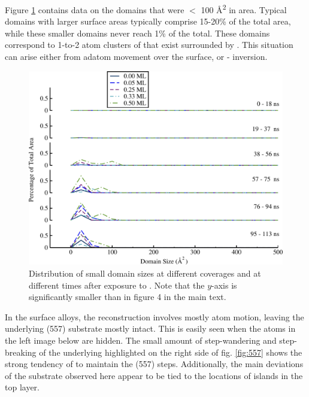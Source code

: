 \newpage

Figure \ref{fig:Pt_SI_small} contains data on the  domains that
were $<$ 100 \AA\textsuperscript{2} in area.  Typical domains with
larger surface areas typically comprise 15-20\% of the total area,
while these smaller domains never reach 1\% of the total. These
domains correspond to 1-to-2 atom clusters of  that exist
surrounded by . This situation can arise either from 
adatom movement over the  surface, or -
inversion.

\begin{figure}
  \includegraphics[width=\linewidth]{../figures/appA/domainSizes_Pt_SI_smallFocus.pdf}
  \caption{Distribution of small  domain sizes at different
     coverages and at different times after exposure to
    . Note that the $y$-axis is significantly smaller than in
    figure 4 in the main text.}
\label{fig:Pt_SI_small}
\end{figure}


\newpage

In the surface alloys, the reconstruction involves mostly  atom
motion, leaving the underlying (557) substrate mostly intact.
This is easily seen when the  atoms in the left image below are
hidden.  The small amount of step-wandering and step-breaking of the
underlying  highlighted on the right side of fig. \ref{fig:557}
shows the strong tendency of  to maintain the (557) steps.
Additionally, the main deviations of the  substrate observed
here appear to be tied to the locations of islands in the  top
layer.

